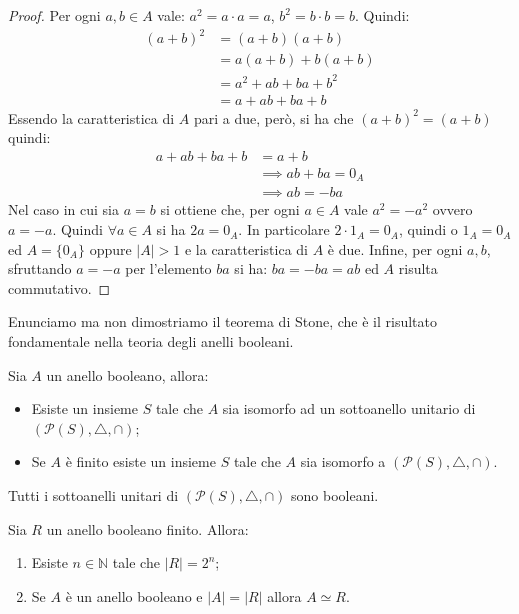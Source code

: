 \begin{proof}
	Per ogni $a,b \in A$ vale: $a^{2}=a \cdot a = a$, $b^{2}= b \cdot b = b$. Quindi:
	\begin{align*}
		(a+b)^{2}&=(a+b)(a+b)\\
		&= a(a+b) + b(a+b)\\
		&= a^{2} + ab + ba + b^{2}\\
		&= a + ab + ba + b
	\end{align*}
	Essendo la caratteristica di $A$ pari a due, però, si ha che $(a+b)^{2}=(a+b)$ quindi:
	\begin{align*}
		a + ab + ba + b &= a+b \\
		&\implies ab+ba = 0_{A} \\
		&\implies ab = -ba
	\end{align*}
	Nel caso in cui sia $a=b$ si ottiene che, per ogni $a \in A$ vale $a^{2}=-a^{2}$ ovvero $a=-a$. Quindi $\forall a \in A$ si ha $2a = 0_{A}$. In particolare $2 \cdot 1_{A} = 0_{A}$, quindi o $1_{A}=0_{A}$ ed $A=\{0_{A}\}$ oppure $|A|>1$ e la caratteristica di $A$ è due. Infine, per ogni $a,b$, sfruttando $a=-a$ per l'elemento $ba$ si ha: $ba = -ba = ab$ ed $A$ risulta commutativo. 
\end{proof}

Enunciamo ma non dimostriamo il teorema di Stone, che è il risultato fondamentale nella teoria degli anelli booleani.

\begin{teorbox}[di Stone]
	Sia $A$ un anello booleano, allora:
	\begin{itemize}
		\item Esiste un insieme $S$ tale che $A$ sia isomorfo ad un sottoanello unitario di $(\mathcal{P}(S),\triangle,\cap)$;
		\item Se $A$ è finito esiste un insieme $S$ tale che $A$ sia isomorfo a $(\mathcal{P}(S),\triangle,\cap)$.
	\end{itemize}
\end{teorbox}

\begin{osservation}
	Tutti i sottoanelli unitari di $(\mathcal{P}(S),\triangle,\cap)$ sono booleani.
\end{osservation}


\begin{corolbox}
	Sia $R$ un anello booleano finito. Allora:
	\begin{enumerate}
		\item Esiste $n\in \mathbb{N}$ tale che $|R|=2^{n}$;
		\item Se $A$ è un anello booleano e $|A| = |R|$ allora $A \simeq R$.
	\end{enumerate}
\end{corolbox}

